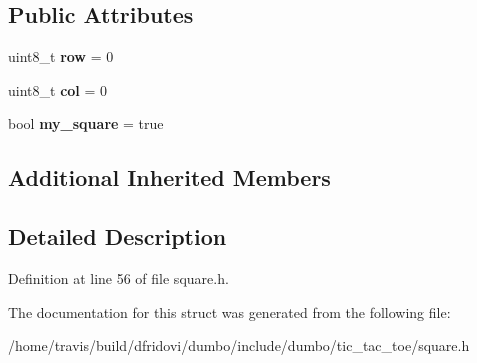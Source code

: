 \subsection*{Public Attributes}
\begin{DoxyCompactItemize}
\item 
\hypertarget{structdumbo_1_1tic_1_1_square_a17fa8a9150e6a6e5dbc1fe0af4676666}{uint8\-\_\-t {\bfseries row} = 0}\label{structdumbo_1_1tic_1_1_square_a17fa8a9150e6a6e5dbc1fe0af4676666}

\item 
\hypertarget{structdumbo_1_1tic_1_1_square_a775434d24532f0ba45fcd35b0323639e}{uint8\-\_\-t {\bfseries col} = 0}\label{structdumbo_1_1tic_1_1_square_a775434d24532f0ba45fcd35b0323639e}

\item 
\hypertarget{structdumbo_1_1tic_1_1_square_a64e4349404fa0476ea44c8b52986d0e6}{bool {\bfseries my\-\_\-square} = true}\label{structdumbo_1_1tic_1_1_square_a64e4349404fa0476ea44c8b52986d0e6}

\end{DoxyCompactItemize}
\subsection*{Additional Inherited Members}


\subsection{Detailed Description}


Definition at line 56 of file square.\-h.



The documentation for this struct was generated from the following file\-:\begin{DoxyCompactItemize}
\item 
/home/travis/build/dfridovi/dumbo/include/dumbo/tic\-\_\-tac\-\_\-toe/square.\-h\end{DoxyCompactItemize}
